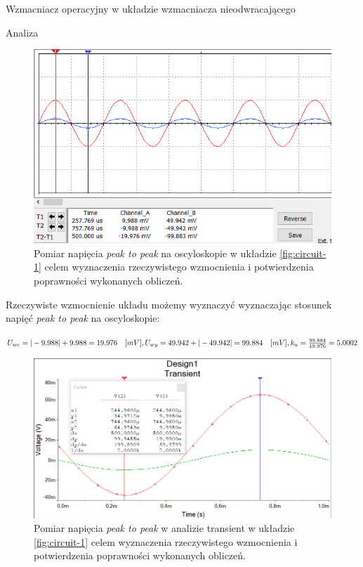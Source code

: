 \documentclass[a4paper]{scrartcl}
\begin{document}
\begin{section}{Wzmacniacz operacyjny w układzie wzmacniacza nieodwracającego}
\begin{subsection}{Analiza}
				\begin{figure}[ht]
				\begin{center}
					\includegraphics[width=0.7\linewidth]{05-osc}
					\caption{Pomiar napięcia \textit{peak to peak} na oscyloskopie w układzie \ref{fig:circuit-1} celem wyznaczenia rzeczywistego wzmocnienia i potwierdzenia poprawności wykonanych obliczeń.}
				\end{center}
				\end{figure}
				\pagebreak

				Rzeczywiste wzmocnienie układu możemy wyznaczyć wyznaczając stosunek napięć \textit{peak to peak} na oscyloskopie: \\
				\begin{center}
					\begin{math}
					 U_{we} = \vert-9.988\vert + 9.988 = 19.976\quad [mV], \\ 
					 U_{wy} = 49.942 + \vert-49.942\vert = 99.884 \quad [mV],\\
					 k_{u} = \frac{99.884}{19.976} = 5.0002
					\end{math}
				\end{center}

				\begin{figure}[!ht]
				\begin{center}
					\includegraphics[width=0.7\linewidth,scale=2]{05-transient}
					\caption{Pomiar napięcia \textit{peak to peak} w analizie transient w układzie \ref{fig:circuit-1} celem wyznaczenia rzeczywistego wzmocnienia i potwierdzenia poprawności wykonanych obliczeń.}
				\end{center}
				\end{figure}


\end{subsection}
\end{section}
\end{document}
